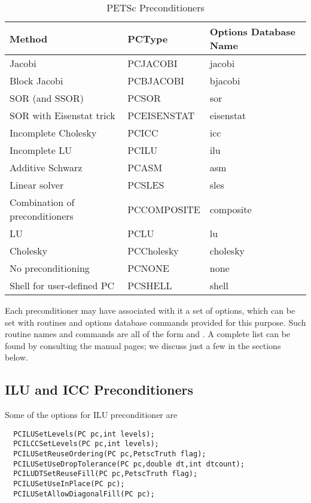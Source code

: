 \begin{table}
\begin{center}
\begin{tabular}{lll}
{\bf Method}    &{\bf PCType}   & {\bf Options Database Name}\\
\hline
Jacobi                               & PCJACOBI      & jacobi\\
Block Jacobi                         & PCBJACOBI     & bjacobi\\
SOR (and SSOR)                       & PCSOR         & sor\\
SOR with Eisenstat trick             & PCEISENSTAT   & eisenstat\\
Incomplete Cholesky                  & PCICC         & icc\\
Incomplete LU                        & PCILU         & ilu\\
Additive Schwarz                     & PCASM         & asm\\
Linear solver                        & PCSLES        & sles \\
Combination of preconditioners       & PCCOMPOSITE   & composite \\
\hline
LU                                   & PCLU          & lu\\
Cholesky                             & PCCholesky    & cholesky\\
No preconditioning                   & PCNONE        & none\\
Shell for user-defined PC            & PCSHELL       & shell\\
\hline
\end{tabular}
\end{center}
\caption{PETSc Preconditioners}
\label{tab:pcdefaults}
\end{table}

Each preconditioner may have associated with it a set of options,
which can be set with routines and options database commands provided
for this purpose.  Such routine names and commands are all of the form
 and .  A
complete list can be found by consulting the manual pages; we discuss
just a few in the sections below.

\subsection{ILU and ICC Preconditioners}
\label{sec:ilu_icc}

Some of the options for ILU preconditioner are 
\begin{verbatim}
  PCILUSetLevels(PC pc,int levels);
  PCILCCSetLevels(PC pc,int levels);
  PCILUSetReuseOrdering(PC pc,PetscTruth flag);
  PCILUSetUseDropTolerance(PC pc,double dt,int dtcount);
  PCILUDTSetReuseFill(PC pc,PetscTruth flag);
  PCILUSetUseInPlace(PC pc); 
  PCILUSetAllowDiagonalFill(PC pc);
\end{verbatim}
 
 
 

